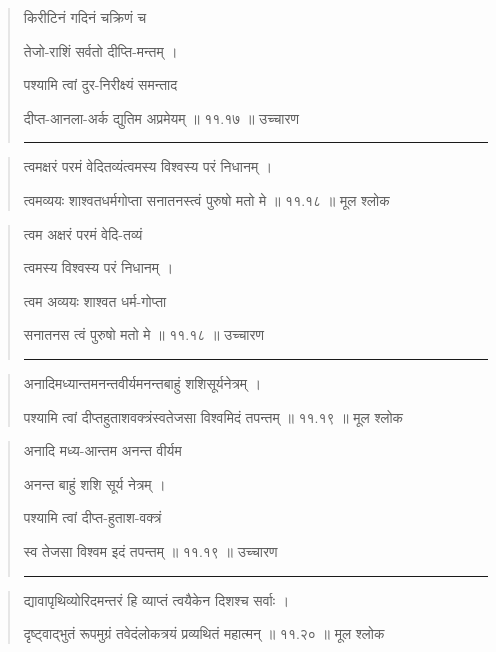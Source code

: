 \begin{quotation}

किरीटिनं गदिनं चक्रिणं च

तेजो-राशिं सर्वतो दीप्ति-मन्तम्‌  ।  

पश्यामि त्वां दुर-निरीक्ष्यं समन्ताद 

दीप्त-आनला-अर्क द्युतिम अप्रमेयम्‌  ॥ ११.१७ ॥  उच्चारण

\noindent\rule{16cm}{0.4pt} 
\end{quotation}


\begin{quotation} 

त्वमक्षरं परमं वेदितव्यंत्वमस्य विश्वस्य परं निधानम्‌  ।  

त्वमव्ययः शाश्वतधर्मगोप्ता सनातनस्त्वं पुरुषो मतो मे  ॥ ११.१८ ॥  मूल श्लोक
\end{quotation}

\begin{quotation}

त्वम अक्षरं परमं वेदि-तव्यं 

त्वमस्य विश्वस्य परं निधानम्‌  ।  

त्वम अव्ययः शाश्वत धर्म-गोप्ता 

सनातनस त्वं पुरुषो मतो मे  ॥ ११.१८ ॥  उच्चारण

\noindent\rule{16cm}{0.4pt} 
\end{quotation}


\begin{quotation} 

अनादिमध्यान्तमनन्तवीर्यमनन्तबाहुं शशिसूर्यनेत्रम्‌  ।  

पश्यामि त्वां दीप्तहुताशवक्त्रंस्वतेजसा विश्वमिदं तपन्तम्‌  ॥ ११.१९ ॥  मूल श्लोक
\end{quotation}

\begin{quotation}

अनादि मध्य-आन्तम अनन्त वीर्यम 

अनन्त बाहुं शशि सूर्य नेत्रम्‌  ।  

पश्यामि त्वां दीप्त-हुताश-वक्त्रं 

स्व तेजसा विश्वम इदं तपन्तम्‌  ॥ ११.१९ ॥  उच्चारण

\noindent\rule{16cm}{0.4pt} 
\end{quotation}


\begin{quotation} 

द्यावापृथिव्योरिदमन्तरं हि व्याप्तं त्वयैकेन दिशश्च सर्वाः  ।  

दृष्ट्वाद्भुतं रूपमुग्रं तवेदंलोकत्रयं प्रव्यथितं महात्मन्‌  ॥ ११.२० ॥  मूल श्लोक
\end{quotation}

